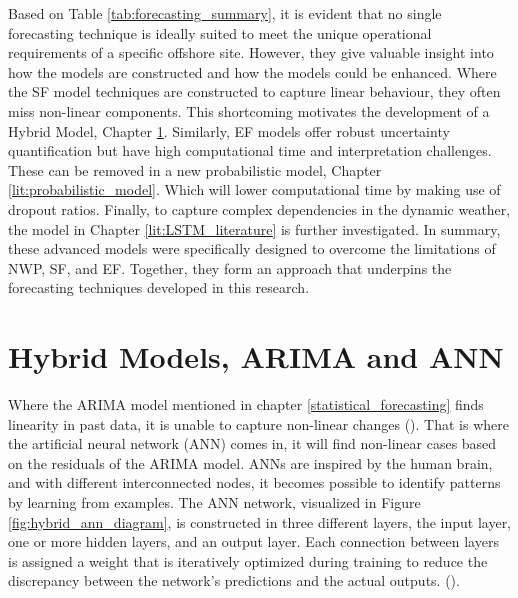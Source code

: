 \noindent Based on Table \ref{tab:forecasting_summary}, it is evident that no single forecasting technique is ideally suited to meet the unique operational requirements of a specific offshore site. However, they give valuable insight into how the models are constructed and how the models could be enhanced. Where the SF model techniques are constructed to capture linear behaviour, they often miss non-linear components. This shortcoming motivates the development of a Hybrid Model, Chapter \ref{lit:hybrid_models}. Similarly, EF models offer robust uncertainty quantification but have high computational time and interpretation challenges. These can be removed in a new probabilistic model, Chapter \ref{lit:probabilistic_model}. Which will lower computational time by making use of dropout ratios. Finally, to capture complex dependencies in the dynamic weather, the model in Chapter \ref{lit:LSTM_literature} is further investigated. In summary, these advanced models were specifically designed to overcome the limitations of NWP, SF, and EF. Together, they form an approach that underpins the forecasting techniques developed in this research.
\newpage
\section{Hybrid Models, ARIMA and ANN}
\label{lit:hybrid_models}
Where the ARIMA model mentioned in chapter \ref{statistical_forecasting} finds linearity in past data, it is unable to capture non-linear changes (\cite{zhang2003time}). That is where the artificial neural network (ANN) comes in, it will find non-linear cases based on the residuals of the ARIMA model. ANNs are inspired by the human brain, and with different interconnected nodes, it becomes possible to identify patterns by learning from examples. The ANN network, visualized in Figure \ref{fig:hybrid_ann_diagram}, is constructed in three different layers, the input layer, one or more hidden layers, and an output layer. Each connection between layers is assigned a weight that is iteratively optimized during training to reduce the discrepancy between the network's predictions and the actual outputs. (\cite{haykin1994neural, buyuksahin2019improving}).

